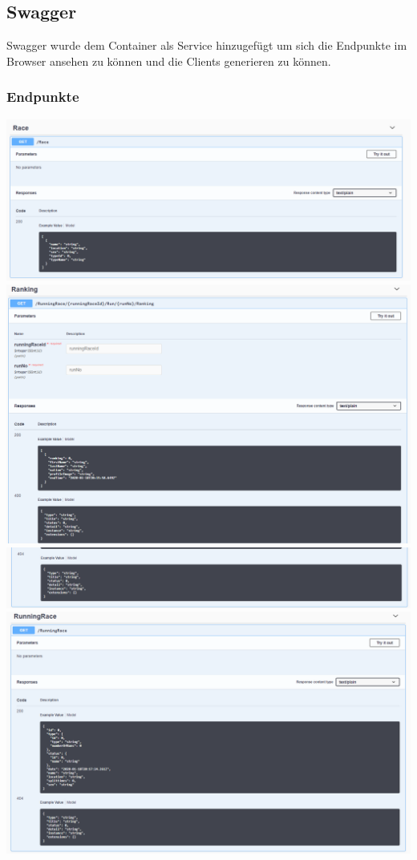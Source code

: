 \documentclass[a4paper, 12pt]{article}
\begin{document}
	\subsection{Swagger}
	Swagger wurde dem Container als Service hinzugefügt um sich die Endpunkte im Browser ansehen zu können und die Clients generieren zu können.
	\subsubsection{Endpunkte}
	\includegraphics[width=.7\textwidth]{img/Controller_race.png}
	\newline
	\includegraphics[width=.7\textwidth]{img/Controller_ranking_1.png}
	\newline
	\includegraphics[width=.7\textwidth]{img/Controller_ranking_2.png}
	\newline
	\includegraphics[width=.7\textwidth]{img/Controller_runningRace_get.png}
\end{document}
